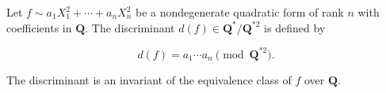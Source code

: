 Let $f \sim a_1 X_1^2 + \cdots + a_n X_n^2$ be a nondegenerate quadratic form of rank $n$ with coefficients in $\mathbf{Q}$. The discriminant $d(f) \in \mathbf{Q}^*/\mathbf{Q}^{*2}$ is defined by

$$d(f) = a_1 \cdots a_n \pmod{\mathbf{Q}^{*2}}.$$

The discriminant is an invariant of the equivalence class of $f$ over $\mathbf{Q}$.
